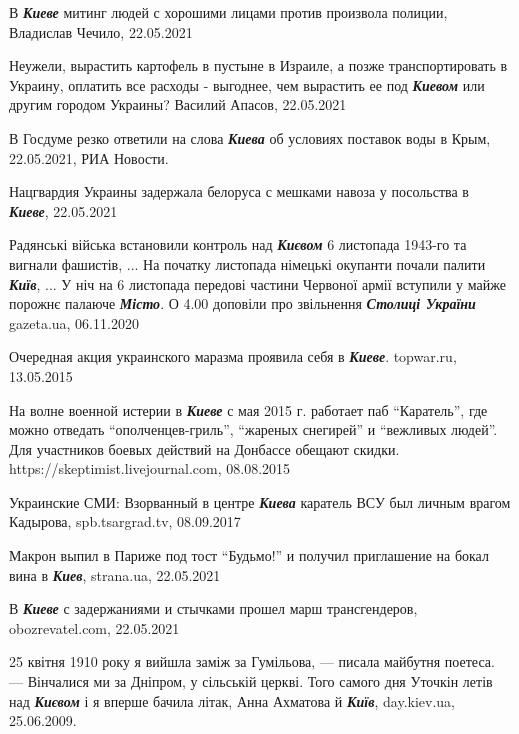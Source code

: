  
 
 
 
 

\def\kv#1{\textbf{\emph{#1}}}

В \kv{Киеве} митинг людей с хорошими лицами против произвола полиции, Владислав
Чечило, 22.05.2021

Неужели, вырастить картофель в пустыне в Израиле, а позже транспортировать в
Украину, оплатить все расходы - выгоднее, чем вырастить ее под \kv{Киевом} или
другим городом Украины? Василий Апасов, 22.05.2021

В Госдуме резко ответили на слова \kv{Киева} об условиях поставок воды в
Крым, 22.05.2021, РИА Новости.

Нацгвардия Украины задержала белоруса с мешками навоза у посольства в
\kv{Киеве}, 22.05.2021

Радянські війська встановили контроль над \kv{Києвом} 6 листопада 1943-го та
вигнали фашистів, ... На початку листопада німецькі окупанти почали палити
\kv{Київ}, ... У ніч на 6 листопада передові частини Червоної армії вступили
у майже порожнє палаюче \kv{Місто}. О 4.00 доповіли про звільнення
\kv{Столиці України} gazeta.ua, 06.11.2020

Очередная акция украинского маразма проявила себя в \kv{Киеве}. topwar.ru,
13.05.2015

На волне военной истерии в \kv{Киеве} с мая 2015 г. работает паб
\enquote{Каратель}, где можно отведать \enquote{ополченцев-гриль},
\enquote{жареных снегирей} и \enquote{вежливых людей}.  Для участников боевых
действий на Донбассе обещают скидки.  https://skeptimist.livejournal.com,
08.08.2015

Украинские СМИ: Взорванный в центре \kv{Киева} каратель ВСУ был личным врагом
Кадырова, spb.tsargrad.tv, 08.09.2017

Макрон выпил в Париже под тост \enquote{Будьмо!} и получил приглашение на бокал
вина в \kv{Киев}, strana.ua, 22.05.2021

В \kv{Киеве} с задержаниями и стычками прошел марш трансгендеров, obozrevatel.com, 22.05.2021

25 квітня 1910 року я вийшла заміж за Гумільова, — писала майбутня поетеса. —
Вінчалися ми за Дніпром, у сільській церкві. Того самого дня Уточкін летів над
\kv{Києвом} і я вперше бачила літак, Анна Ахматова й \kv{Київ},
day.kiev.ua, 25.06.2009.

